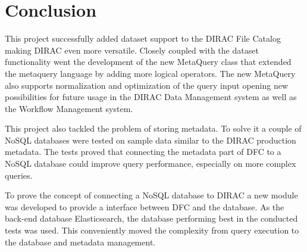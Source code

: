 \chapter*{Conclusion}

This project successfully added dataset support to the DIRAC File Catalog making DIRAC even more 
versatile. Closely coupled with the dataset functionality went the development of the new MetaQuery
class that extended the metaquery language by adding more logical operators. The new MetaQuery also
supports normalization and optimization of the query input opening new possibilities for future usage
in the DIRAC Data Management system as well as the Workflow Management system. 

This project also tackled the problem of storing metadata. To solve it a couple of NoSQL databases were tested
on sample data similar to the DIRAC production metadata. The tests proved that connecting the 
metadata part of DFC to a NoSQL database could improve query performance, especially on more complex
queries. 

To prove the concept of connecting a NoSQL database to DIRAC a new module was developed to provide 
a interface between DFC and the database. As the back-end database Elasticsearch, the database performing 
best in the conducted tests was used. This conveniently moved the complexity from query execution to the database 
and metadata management.